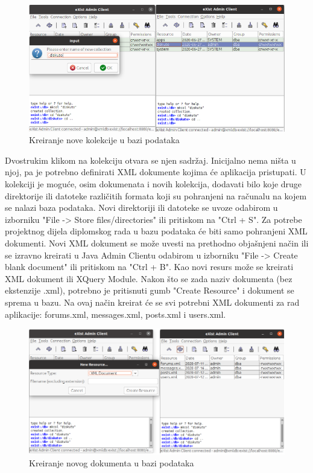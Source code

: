 \documentclass{foi}
\begin{document}
\begin{figure}[h!]
    \centering
    \includegraphics[width=1\textwidth]{slike/kreiranje-kolekcije.png}
    \caption{Kreiranje nove kolekcije u bazi podataka}
\end{figure}

Dvostrukim klikom na kolekciju otvara se njen sadržaj. Inicijalno nema ništa u njoj, pa je potrebno definirati XML dokumente kojima će aplikacija pristupati. U kolekciji je moguće, osim dokumenata i novih kolekcija, dodavati bilo koje druge direktorije ili datoteke različitih formata koji su pohranjeni na računalu na kojem se nalazi baza podataka. Novi direktoriji ili datoteke se uvoze odabirom u izborniku "File -> Store files/directories" ili pritiskom na "Ctrl + S". Za potrebe projektnog dijela diplomskog rada u bazu podataka će biti samo pohranjeni XML dokumenti. Novi XML dokument se može uvesti na prethodno objašnjeni način ili se izravno kreirati u Java Admin Clientu odabirom u izborniku "File -> Create blank document" ili pritiskom na "Ctrl + B". Kao novi resurs može se kreirati XML dokument ili XQuery Module. Nakon što se zada naziv dokumenta (bez ekstenzije .xml), potrebno je pritisnuti gumb "Create Resource" i dokument se sprema u bazu. Na ovaj način kreirat će se svi potrebni XML dokumenti za rad aplikacije: forums.xml, messages.xml, posts.xml i users.xml.

\begin{figure}[h!]
    \centering
    \includegraphics[width=1\textwidth]{slike/kreiranje-dokumenta.png}
    \caption{Kreiranje novog dokumenta u bazi podataka}
\end{figure}
\end{document}
